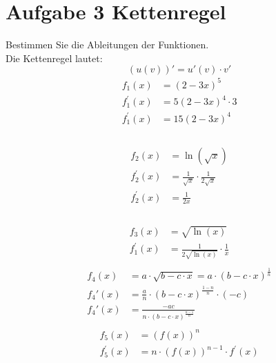 \documentclass[18pt, 4paper]{article}
\begin{document}
\section*{Aufgabe 3 Kettenregel}
Bestimmen Sie die Ableitungen der Funktionen.\\
Die Kettenregel lautet:
\begin{equation*}
	\left(u(v)\right)' = u'(v)\cdot v'
\end{equation*}
\begin{align*}
	f_1(x) &= (2-3x)^5\\
	f_1^{'}(x) &= 5(2-3x)^4\cdot3\\
	f_1^{'}(x) &= 15(2-3x)^4\\
\end{align*}
\hfill\\
\begin{align*}
	f_2(x) &= \ln(\sqrt{x})\\
	f_2^{'}(x) &= \frac{1}{\sqrt{x}} \cdot \frac{1}{2\sqrt{x}}\\
	f_2^{'}(x) &= \frac{1}{2x}\\
\end{align*}
\hfill\\
\begin{align*}
	f_3(x) &= \sqrt{\ln(x)}\\
	f_1^{'}(x) &= \frac{1}{2\sqrt{\ln(x)}} \cdot \frac{1}{x}\\
\end{align*}
\begin{align*}
	f_4(x) &= a \cdot \sqrt{b - c\cdot x}= a\cdot(b - c\cdot x)^{\frac{1}{n}}\\
	f_4{'}(x) &= \frac{a}{n} \cdot (b- c\cdot x)^{\frac{1-n}{n}} \cdot (-c)\\
	f_4{'}(x) &= \frac{-ac}{n \cdot (b- c\cdot x)^{\frac{n-1}{n}}}\\
\end{align*}
\begin{align*}
	f_5(x) &= \left(f(x)\right)^n\\
	f_5^{'}(x) &= n \cdot \left(f(x)\right)^{n-1} \cdot f^{'}(x)\\
\end{align*}
\
\end{document}
